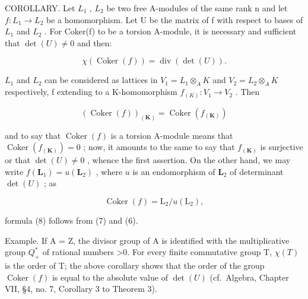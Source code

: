 COROLLARY. Let \(L_{1}\) , \(L_{2}\) be two free A-modules of the same rank n and let \(f: L_{1} \to L_{2}\) be a homomorphism. Let U be the matrix of f with respect to bases of \(L_{1}\) and \(L_{2}\) . For Coker(f) to be a torsion A-module, it is necessary and sufficient that \(\det(U) \neq 0\) and then:

\[
\chi (\operatorname{Coker} (f)) = \operatorname{div} (\det (U)).\tag{8}
\]

\(L_{1}\) and \(L_{2}\) can be considered as lattices in \(V_{1} = L_{1} \otimes_{A} K\) and \(V_{2} = L_{2} \otimes_{A} K\) respectively, f extending to a K-homomorphism \(f_{(K)}: V_{1} \to V_{2}\) . Then

\[
\left(\operatorname{Coker} (f)\right) _ {(\mathbf {K})} = \operatorname{Coker} \left(f _ {(\mathbf {K})}\right)
\]

and to say that \(\operatorname{Coker}(f)\) is a torsion A-module means that \(\operatorname{Coker}(f_{(\mathbf{K})}) = 0\) ; now, it amounts to the same to say that \(f_{(\mathbf{K})}\) is surjective or that \(\det(U) \neq 0\) , whence the first assertion. On the other hand, we may write \(f(\mathbf{L}_1) = u(\mathbf{L}_2)\) , where \(u\) is an endomorphism of \(\mathbf{L}_2\) of determinant \(\det(U)\) ; as

\[
\operatorname{Coker} (f) = \mathrm{L} _ {2} / u (\mathrm{L} _ {2}),
\]

formula (8) follows from (7) and (6).

Example. If A = Z, the divisor group of A is identified with the multiplicative group \(Q_{+}^{*}\) of rational numbers \textgreater0. For every finite commutative group T, \(\chi(T)\) is the order of T; the above corollary shows that the order of the group \(\operatorname{Coker}(f)\) is equal to the absolute value of \(\det(U)\) (cf.~Algebra, Chapter VII, §4, no. 7, Corollary 3 to Theorem 3).
\relax{}
